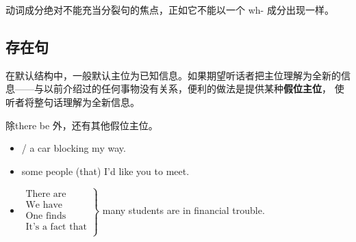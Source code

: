 动词成分绝对不能充当分裂句的焦点，正如它不能以一个 wh- 成分出现一样。


\subsection{存在句}
\label{subsec:behave}

在默认结构中，一般默认主位为已知信息。如果期望听话者把主位理解为全新的信
息——与以前介绍过的任何事物没有关系，便利的做法是提供某种\textbf{假位主位}，
使听者将整句话理解为全新信息。

除there be 外，还有其他假位主位。

\begin{itemize}
\item {} /  a car blocking my way.

\item{} some people (that) I'd like you to meet.

\item $\left.
    \begin{aligned}
      \text{There are} \\
      \text{We have} \\
      \text{One finds} \\
      \text{It's a fact that} \\
    \end{aligned}
  \right\}$ many students are in financial trouble.
\end{itemize}



